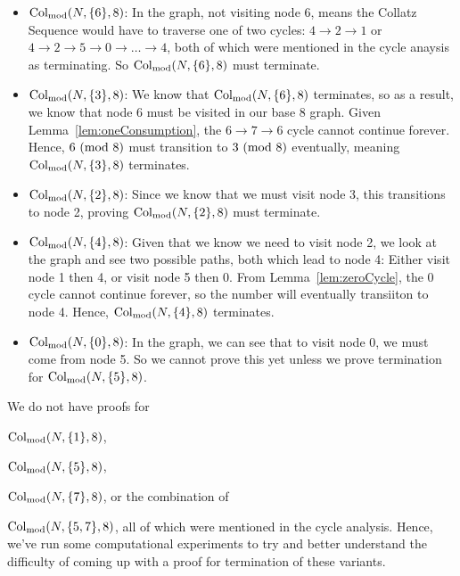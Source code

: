 \begin{itemize}
    \item \textbf{$\mathrm{Col}_{\text{mod}}(N,\{6\},8)$}: In the graph, not visiting node $6$, means the Collatz Sequence would have to traverse one of two cycles: $4 \rightarrow 2 \rightarrow 1$ or $4 \rightarrow 2 \rightarrow 5 \rightarrow 0 \rightarrow \ldots \rightarrow 4$, both of which were mentioned in the cycle anaysis as terminating. So $\mathrm{Col}_{\text{mod}}(N,\{6\},8)$ must terminate.
    \item \textbf{$\mathrm{Col}_{\text{mod}}(N,\{3\},8)$}: We know that $\mathrm{Col}_{\text{mod}}(N,\{6\},8)$ terminates, so as a result, we know that node 6 must be visited in our base 8 graph.  Given Lemma~\ref{lem:oneConsumption}, the $6 \rightarrow 7 \rightarrow 6$ cycle cannot continue forever. Hence, $6\ (\mathrm{mod}\ 8)$ must transition to $3\ (\mathrm{mod}\ 8)$ eventually, meaning $\mathrm{Col}_{\text{mod}}(N,\{3\},8)$ terminates.
    \item \textbf{$\mathrm{Col}_{\text{mod}}(N,\{2\},8)$}: Since we know that we must visit node 3, this transitions to node 2, proving $\mathrm{Col}_{\text{mod}}(N,\{2\},8)$ must terminate.
    \item \textbf{$\mathrm{Col}_{\text{mod}}(N,\{4\},8)$}: Given that we know we need to visit node 2, we look at the graph and see two possible paths, both which lead to node 4: Either visit node 1 then 4, or visit node 5 then 0. From Lemma~\ref{lem:zeroCycle}, the 0 cycle cannot continue forever, so the number will eventually transiiton to node 4. Hence, $\mathrm{Col}_{\text{mod}}(N,\{4\},8)$ terminates.
    \item \textbf{$\mathrm{Col}_{\text{mod}}(N,\{0\},8)$}: In the graph, we can see that to visit node 0, we must come from node 5. So we cannot prove this yet unless we prove termination for $\mathrm{Col}_{\text{mod}}(N,\{5\},8)$.
\end{itemize}
We do not have proofs for \item $\mathrm{Col}_{\text{mod}}(N,\{1\},8)$, \item $\mathrm{Col}_{\text{mod}}(N,\{5\},8)$, \item $\mathrm{Col}_{\text{mod}}(N,\{7\},8)$, or the combination of \item $\mathrm{Col}_{\text{mod}}(N,\{5,7\},8)$, all of which were mentioned in the cycle analysis. Hence, we've run some computational experiments to try and better understand the difficulty of coming up with a proof for termination of these variants. 
